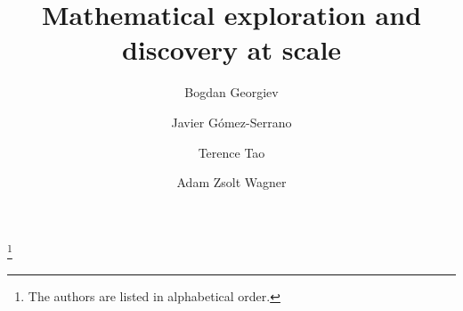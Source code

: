 \documentclass[10pt,a4paper,reqno]{amsart}
\numberwithin{equation}{section}
\theoremstyle{plain}
\theoremstyle{definition}
\theoremstyle{hyperlinkproblem}
\begin{document}
\title{Mathematical exploration and discovery at scale}

\author[Bogdan Georgiev]{Bogdan Georgiev}
\author[Javier G\'omez-Serrano]{Javier G\'omez-Serrano}
\author[Terence Tao]{Terence Tao}
\author[Adam Zsolt Wagner]{Adam Zsolt Wagner}

\address[Bogdan Georgiev]{Google DeepMind, Handyside Street, Kings Cross, London N1C 4UZ, UK}

\address[Javier G\'omez-Serrano]{Department of Mathematics, Brown University, 314 Kassar House, 151 Thayer St., Providence, RI 02912, USA \\
Institute for Advanced Study, 1 Einstein Drive, Princeton, NJ 08540, USA}

\address[Terence Tao]{UCLA Department of Mathematics, Los Angeles, CA 90095-1555.}

\address[Adam Zsolt Wagner]{Google DeepMind, Handyside Street, Kings Cross, London N1C 4UZ, UK}
\thanks{The authors are listed in alphabetical order.}




\end{document}
